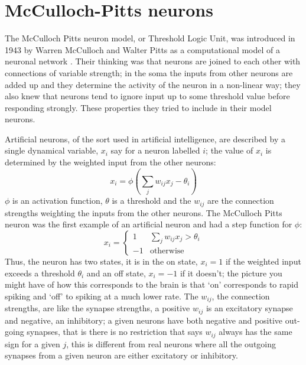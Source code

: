 \documentclass[12pt]{article}
\begin{document}
\section*{McCulloch-Pitts neurons} 

The McCulloch Pitts neuron model, or Threshold Logic Unit, was
introduced in 1943 by Warren McCulloch and Walter Pitts as a
computational model of a neuronal network \cite{McCullochPitts1943}. Their thinking was that
neurons are joined to each other with connections of variable
strength; in the soma the inputs from other neurons are added up and
they determine the activity of the neuron in a non-linear way; they
also knew that neurons tend to ignore input up to some threshold value
before responding strongly. These properties they tried to include in
their model neurons.

Artificial neurons, of the sort used in artificial intelligence, are
described by a single dynamical variable, $x_i$ say for a neuron
labelled $i$; the value of $x_i$ is determined by the weighted input
from the other neurons:
\begin{equation}
x_i=\phi\left(\sum_j w_{ij} x_j-\theta_i\right)
\end{equation}
$\phi$ is an activation function, $\theta$ is a threshold and the
$w_{ij}$ are the connection strengths weighting the inputs from the
other neurons. The McCulloch Pitts neuron was the first example of an
artificial neuron and had a step function for $\phi$:
\begin{equation}
x_i=\left\{\begin{array}{ll}1&\sum_j w_{ij} x_j>\theta_i\\-1&\mbox{otherwise}\end{array}\right.
\end{equation}
Thus, the neuron has two states, it is in the on state, $x_i=1$ if the
weighted input exceeds a threshold $\theta_i$ and an off state,
$x_i=-1$ if it doesn't; the picture you might have of how this
corresponds to the brain is that \lq{}on\rq{} corresponds to rapid
spiking and \lq{}off\rq{} to spiking at a much lower rate. The
$w_{ij}$, the connection strengths, are like the synapse strengths, a
positive $w_{ij}$ is an excitatory synapse and negative, an
inhibitory; a given neurons have both negative and positive
out-going synapses, that is there is no restriction that says $w_{ij}$
always has the same sign for a given $j$, this is different from real
neurons where all the outgoing synapses from a given neuron are either
excitatory or inhibitory.
\end{document}

